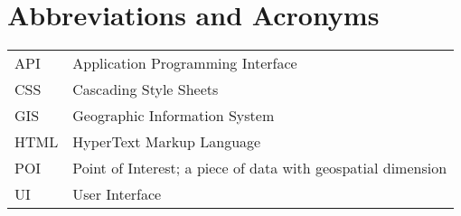 
\chapter*{Abbreviations and Acronyms}


\noindent
\begin{longtable}{@{}p{}p{}@{}}
API & Application Programming Interface \\
CSS & Cascading Style Sheets \\
GIS & Geographic Information System \\
HTML & HyperText Markup Language \\
POI & Point of Interest; a piece of data with geospatial dimension \\
UI & User Interface \\

\end{longtable}
